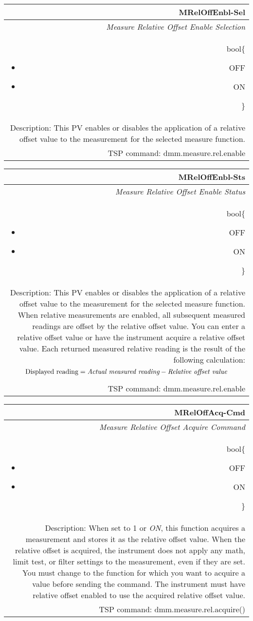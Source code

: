 \documentclass[openany]{article}
\begin{document}
		\begin{tabular}{N}
			\hline
			\bfseries MRelOffEnbl-Sel\label{pv:mreloffenbl-sel} \\ \hline
			\emph{Measure Relative Offset Enable Selection} \\
			bool\{\begin{itemize}[noitemsep]
				\small
				\item[] OFF
				\item[] ON
			\end{itemize}\} \\
			Description: This PV enables or disables the application of a relative offset value to the measurement for the selected measure function. \\
			TSP command: dmm.measure.rel.enable
		\end{tabular}

		\begin{tabular}{N}
			\hline
			\bfseries MRelOffEnbl-Sts\label{pv:mreloffenbl-sts} \\ \hline
			\emph{Measure Relative Offset Enable Status} \\
			bool\{\begin{itemize}[noitemsep]
				\small
				\item[] OFF
				\item[] ON
			\end{itemize}\} \\
			Description: This PV enables or disables the application of a relative offset value to the measurement for the selected measure function. When relative measurements are enabled, all subsequent measured readings are offset by the relative offset value. You can enter a relative offset value or have the instrument acquire a relative offset value. Each returned measured relative reading is the result of the following calculation: $$\text{Displayed reading} = \emph{Actual measured reading} - \emph{Relative offset value}$$ \\
			TSP command: dmm.measure.rel.enable
		\end{tabular}

		\begin{tabular}{N}
			\hline
			\bfseries MRelOffAcq-Cmd\label{pv:mreloffacq-cmd} \\ \hline
			\emph{Measure Relative Offset Acquire Command} \\
			bool\{\begin{itemize}[noitemsep]
				\small
				\item[] OFF
				\item[] ON
			\end{itemize}\} \\
			Description: When set to 1 or \emph{ON}, this function acquires a measurement and stores it as the relative offset value. When the relative offset is acquired, the instrument does not apply any math, limit test, or filter settings to the measurement, even if they are set. You must change to the function for which you want to acquire a value before sending the command. The instrument must have relative offset enabled to use the acquired relative offset value. \\
			TSP command: dmm.measure.rel.acquire()
		\end{tabular}
\end{document}
